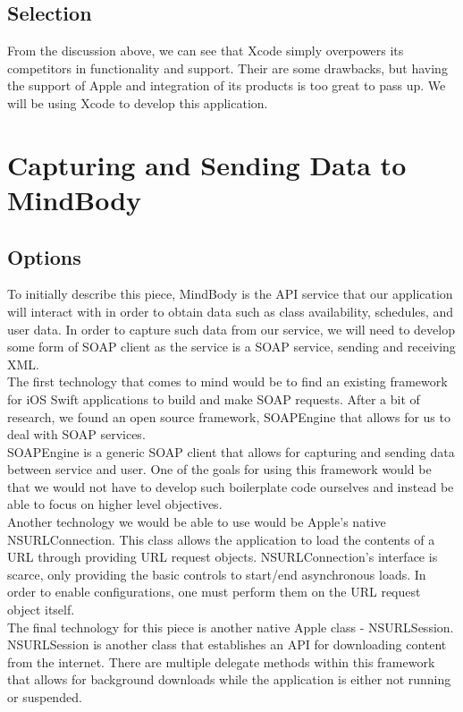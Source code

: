 \documentclass[letterpaper,10pt,titlepage]{article}
\begin{document}
\subsection{Selection}
From the discussion above, we can see that Xcode simply overpowers its competitors in functionality and support. Their are some drawbacks, but having the support of Apple and integration of its products is too great to pass up. We will be using Xcode to develop this application.

\section{Capturing and Sending Data to MindBody}

\subsection{Options}

To initially describe this piece, MindBody is the API service that our application will interact with in order to obtain data such as class availability, schedules, and user data. In order to capture such data from our service, we will need to develop some form of SOAP client as the service is a SOAP service, sending and receiving XML.\\

The first technology that comes to mind would be to find an existing framework for iOS Swift applications to build and make SOAP requests. After a bit of research, we found an open source framework, SOAPEngine that allows for us to deal with SOAP services.\\

SOAPEngine is a generic SOAP client that allows for capturing and sending data between service and user. One of the goals for using this framework would be that we would not have to develop such boilerplate code ourselves and instead be able to focus on higher level objectives.\\

Another technology we would be able to use would be Apple's native NSURLConnection. This class allows the application to load the contents of a URL through providing URL request objects. NSURLConnection's interface is scarce, only providing the basic controls to start/end asynchronous loads.\cite{networking2} In order to enable configurations, one must perform them on the URL request object itself.\\

The final technology for this piece is another native Apple class - NSURLSession. NSURLSession is another class that establishes an API for downloading content from the internet.\cite{networking1} There are multiple delegate methods within this framework that allows for background downloads while the application is either not running or suspended.\\
\end{document}
